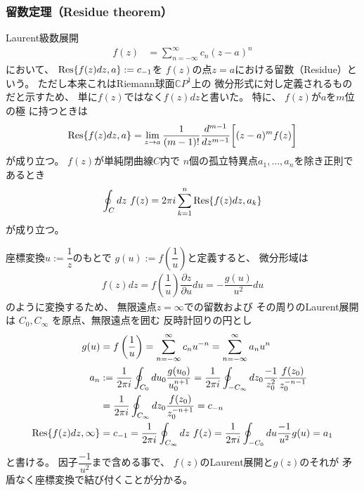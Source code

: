 \subsubsection{留数定理（Residue theorem）}

Laurent級数展開
\begin{align}
    f(z)
    &= \sum_{n=-\infty}^{\infty}
        c_n (z-a)^n
\end{align}
において、
$\Res{f(z)dz, a} := c_{-1}$を
$f(z)$の点$z=a$における留数（Residue）という。
ただし本来これはRiemann球面$\mathbb{C}P^1$上の
微分形式に対し定義されるものだと示すため、
単に$f(z)$ではなく$f(z)dz$と書いた。
特に、
$f(z)$が$a$を$m$位の極
に持つときは
\begin{align}
    \Res{f(z)dz, a}
    =
    \lim_{z \to a}
    \dfrac{1}{(m-1)!}
    \dfrac{d^{m-1}}{dz^{m-1}}
    \bigg[
        (z-a)^m f(z)
    \bigg]
\end{align}
が成り立つ。
$f(z)$が単純閉曲線$C$内で
$n$個の孤立特異点$a_1,\dots,a_n$を除き正則であるとき
\begin{align}
    \oint_C dz\ f(z)
    =
    2 \pi i \sum_{k=1}^n
    \Res{f(z)dz, a_k}
\end{align}
が成り立つ。

座標変換$u := \dfrac{1}{z}$のもとで
$    g(u)
:=
    f
    \left( \dfrac{1}{u} \right)
$と定義すると、
微分形域は
\begin{align}
    f(z) dz
    =
    f
    \left( \dfrac{1}{u} \right)
    \dfrac{\partial z}{\partial u}
    du
    =
    - \dfrac{ g (u) }{u^2}
    du
\end{align}
のように変換するため、
無限遠点$z = \infty$での留数および
その周りのLaurent展開は
$C_{0}, C_{\infty}$
を原点、無限遠点を囲む
反時計回りの円とし
\begin{subequations}
\begin{align}
    g(u)
&=
    f
    \left( \dfrac{1}{u} \right)
=
    \sum_{n=-\infty}^{\infty}
        c_{n} u^{-n}
=
    \sum_{n=-\infty}^{\infty}
        a_n u^n
\\
    a_n
    &:= \dfrac{1}{2 \pi i}
    \oint_{C_0} du_0 \dfrac{g(u_0)}{u_0^{n+1}}
=
    \dfrac{1}{2 \pi i}
    \oint_{- C_\infty}
        dz_0
        \dfrac{- 1}{z_0^2}
        \dfrac{
            f ( z_0 )
        }{z_0^{-n-1}}
\notag\\&
=
    \dfrac{1}{2 \pi i}
    \oint_{C_\infty}
        dz_0
        \dfrac{
            f ( z_0 )
        }{z_0^{-n+1}}
    = c_{-n}
\\
    \Res{f(z)dz, \infty}
& = c_{-1} =
    \dfrac{1}{2 \pi i}
    \oint_{C_{\infty}} dz\ f(z)
=
    \dfrac{1}{2 \pi i}
    \oint_{- C_{0}} du
    \dfrac{ -1 }{u^2}
    g(u)
=   a_1
\end{align}
\end{subequations}
と書ける。
因子$\dfrac{-1}{u^2}$まで含める事で、
$f(z)$のLaurent展開と$g(z)$のそれが
矛盾なく座標変換で結び付くことが分かる。


